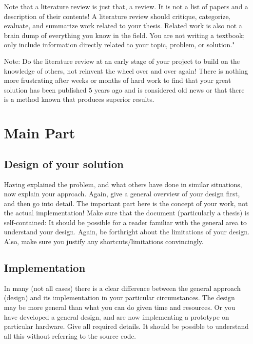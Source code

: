 \documentclass[a4paper,twoside, openright,12pt]{report}
\begin{document}
Note that a literature review is just that, a review. It is not a list of papers and a description of their contents! A literature review should critique, categorize, evaluate, and summarize work related to your thesis. Related work is also not a brain dump of everything you know in the field. You are not writing a textbook; only include information directly related to your topic, problem, or solution."

Note: Do the literature review at an early stage of your project to build on the knowledge of others, not reinvent the wheel over and over again! There is nothing more frustrating after weeks or months of hard work to find that your great solution has been published 5 years ago and is considered old news or that there is a method known that produces superior results.




\chapter{Main Part}

\section{Design of your solution}

Having explained the problem, and what others have done in similar situations, now explain your approach. Again, give a general overview of your design first, and then go into detail. The important part here is the concept of your work, not the actual implementation! Make sure that the document (particularly a thesis) is self-contained: It should be possible for a reader familiar with the general area to understand your design. Again, be forthright about the limitations of your design. Also, make sure you justify any shortcuts/limitations convincingly.

\section{Implementation}

In many (not all cases) there is a clear difference between the general approach (design) and its implementation in your particular circumstances. The design may be more general than what you can do given time and resources. Or you have developed a general design, and are now implementing a prototype on particular hardware. Give all required details. It should be possible to understand all this without referring to the source code. 
\end{document}
